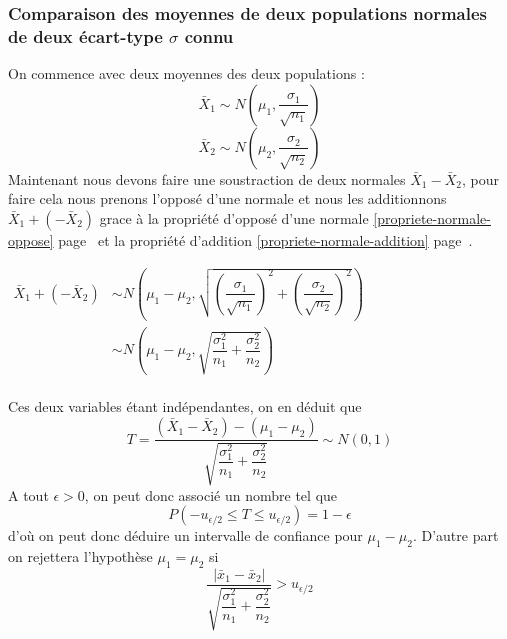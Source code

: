 \subsubsection{Comparaison des moyennes de deux populations normales de deux écart-type $\sigma$ connu}
On commence avec deux moyennes des deux populations :
$$\bar{X}_1 \sim N \left( \mu_1, \dfrac{\sigma_1}{\sqrt{n_1}} \right)$$
$$\bar{X}_2 \sim N \left( \mu_2, \dfrac{\sigma_2}{\sqrt{n_2}} \right)$$
Maintenant nous devons faire une soustraction de deux normales $\bar{X}_1 - \bar{X}_2$, pour faire cela nous prenons l'opposé d'une normale et nous les additionnons $\bar{X}_1 + (-\bar{X}_2)$ grace à la propriété d'opposé d'une normale \ref{propriete-normale-oppose} page~\pageref{propriete-normale-oppose} et la propriété d'addition \ref{propriete-normale-addition} page~\pageref{propriete-normale-addition}.
\begin{center}
	$\begin{array}{LL}
		\bar{X}_1 + (-\bar{X}_2) &\sim N \left( \mu_1 - \mu_2, \sqrt{\left(\dfrac{\sigma_1}{\sqrt{n_1}}\right)^2 + \left(\dfrac{\sigma_2}{\sqrt{n_2}}\right)^2} \right)\\
				     &\sim N \left( \mu_1 - \mu_2, \sqrt{\dfrac{\sigma_1^2}{n_1} + \dfrac{\sigma_2^2}{n_2}} \right)\\
	\end{array}$
\end{center}
Ces deux variables étant indépendantes, on en déduit que
$$\boxed{T = \dfrac{(\bar{X}_1 - \bar{X}_2) - (\mu_1 - \mu_2)}{\sqrt{\dfrac{\sigma_1^2}{n_1} + \dfrac{\sigma_2^2}{n_2}}} \sim N(0,1)}$$
A tout $\epsilon > 0$, on peut donc associé un nombre tel que $$P\left(-u_{\epsilon/2} \leq T \leq u_{\epsilon/2} \right) = 1 - \epsilon$$ d'où on peut donc déduire un intervalle de confiance pour $\mu_1 - \mu_2$. D'autre part on rejettera l'hypothèse $\mu_1 = \mu_2$ si $$\dfrac{|\bar{x}_1 - \bar{x}_2|}{\sqrt{\dfrac{\sigma_1^2}{n_1} + \dfrac{\sigma_2^2}{n_2}}} > u_{\epsilon/2}$$










\newpage

